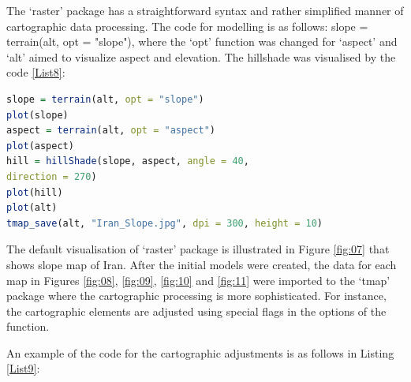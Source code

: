 \documentclass[12pt,a4paper,oneside]{article}
\def \newpar{\vspace{6pt}}
\begin{document}
\newpar The ‘raster’ package has a straightforward syntax and rather simplified manner of cartographic data processing. The code for modelling is as follows: slope = terrain(alt, opt = "slope"), where the ‘opt’ function was changed for ‘aspect’ and ‘alt’ aimed to visualize aspect and elevation. The hillshade was visualised by the code \ref{List8}:

\begin{lstlisting}[frame=single,language=R,basicstyle=\scriptsize]
slope = terrain(alt, opt = "slope")
plot(slope)
aspect = terrain(alt, opt = "aspect")
plot(aspect)
hill = hillShade(slope, aspect, angle = 40, 
direction = 270)
plot(hill)
plot(alt)
tmap_save(alt, "Iran_Slope.jpg", dpi = 300, height = 10)
\end{lstlisting}

\newpar The default visualisation of ‘raster’ package is illustrated in Figure \ref{fig:07} that  shows slope map of Iran. After the initial models were created, the data for each map in Figures \ref{fig:08}, \ref{fig:09}, \ref{fig:10} and \ref{fig:11} were imported to the ‘tmap’ package where the cartographic processing is more sophisticated. For instance, the cartographic elements are adjusted using special flags in the options of the function. 

\newpar An example of the code for the cartographic adjustments is as follows in Listing \ref{List9}: 
\end{document}
